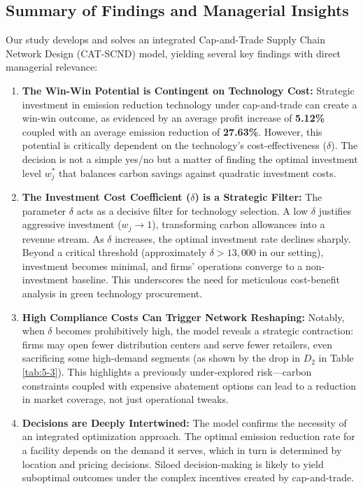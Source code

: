 \documentclass[]{article}
\theoremstyle{plain}%
\theoremstyle{definition}
\theoremstyle{remark}
\theoremstyle{plain}%
\begin{document}
\subsection{Summary of Findings and Managerial Insights}

Our study develops and solves an integrated Cap-and-Trade Supply Chain Network Design (CAT-SCND) model, yielding several key findings with direct managerial relevance:
\begin{enumerate}[label=(\arabic*), leftmargin=*]
    \item \textbf{The Win-Win Potential is Contingent on Technology Cost:} Strategic investment in emission reduction technology under cap-and-trade can create a win-win outcome, as evidenced by an average profit increase of \textbf{5.12\%} coupled with an average emission reduction of \textbf{27.63\%}. However, this potential is critically dependent on the technology's cost-effectiveness ($\delta$). The decision is not a simple yes/no but a matter of finding the optimal investment level $w_j^*$ that balances carbon savings against quadratic investment costs.
    \item \textbf{The Investment Cost Coefficient ($\delta$) is a Strategic Filter:} The parameter $\delta$ acts as a decisive filter for technology selection. A low $\delta$ justifies aggressive investment ($w_j \rightarrow 1$), transforming carbon allowances into a revenue stream. As $\delta$ increases, the optimal investment rate declines sharply. Beyond a critical threshold (approximately $\delta > 13,000$ in our setting), investment becomes minimal, and firms' operations converge to a non-investment baseline. This underscores the need for meticulous cost-benefit analysis in green technology procurement.
    \item \textbf{High Compliance Costs Can Trigger Network Reshaping:} Notably, when $\delta$ becomes prohibitively high, the model reveals a strategic contraction: firms may open fewer distribution centers and serve fewer retailers, even sacrificing some high-demand segments (as shown by the drop in $D_2$ in Table \ref{tab:5-3}). This highlights a previously under-explored risk—carbon constraints coupled with expensive abatement options can lead to a reduction in market coverage, not just operational tweaks.
    \item \textbf{Decisions are Deeply Intertwined:} The model confirms the necessity of an integrated optimization approach. The optimal emission reduction rate for a facility depends on the demand it serves, which in turn is determined by location and pricing decisions. Siloed decision-making is likely to yield suboptimal outcomes under the complex incentives created by cap-and-trade.
\end{enumerate}
\end{document}
